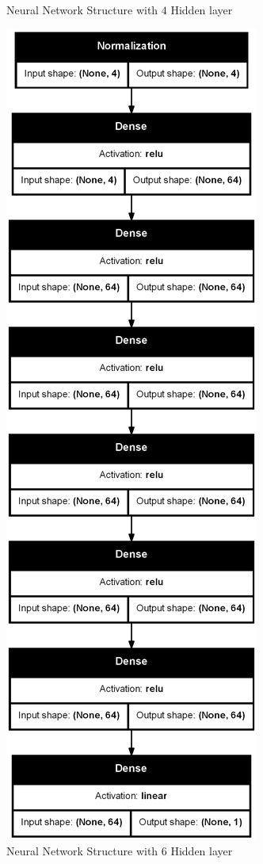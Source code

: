 \begin{figure}[H]
\begin{minipage}{0.4\textwidth}
      \caption{Neural Network Structure with $4$ Hidden layer}
  \end{minipage}
  \hfill
  \begin{minipage}{0.4\textwidth}
      \centering
      \includegraphics[width=\linewidth]{images/Results/Neural Net/6HL/structure.png}
      \caption{Neural Network Structure with $6$ Hidden layer}
  \end{minipage}
\end{figure}


